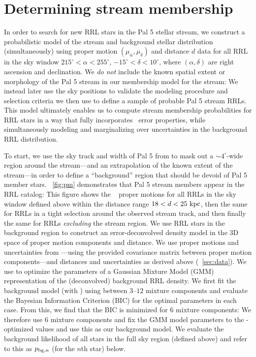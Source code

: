\documentclass[twocolumn]{aastex63}
\begin{document}
\section{Determining stream membership} \label{sec:membership}

In order to search for new RRL stars in the Pal 5 stellar stream, we construct a probabilistic model of the stream and background stellar distribution (simultaneously) using proper motion $(\mu_\alpha, \mu_\delta)$ and distance $d$ data for all RRL in the sky window $215^\circ < \alpha < 255^\circ$, $-15^\circ < \delta < 10^\circ$, where $(\alpha, \delta)$ are right ascension and declination.
We \emph{do not} include the known spatial extent or morphology of the Pal 5 stream in our membership model for the stream: We instead later use the sky positions to validate the modeling procedure and selection criteria we then use to define a sample of probable Pal 5 stream RRLs.
This model ultimately enables us to compute stream membership probabilities for RRL stars in a way that fully incorporates \Gaia\ error properties, while simultaneously modeling and marginalizing over uncertainties in the background RRL distribution.

To start, we use the sky track and width of Pal 5 from \citet{Bonaca:2019} to mask out a $\sim4^\circ$-wide region around the stream---and an extrapolation of the known extent of the stream---in order to define a ``background'' region that should be devoid of Pal 5 member stars.
\figurename~\ref{fig:pm} demonstrates that Pal 5 stream members appear in the RRL catalog: This figure shows the \Gaia\  proper motions for all RRLs in the sky window defined above within the distance range $18 < d < 25~\mathrm{kpc}$, then the same for RRLs in a tight selection around the observed stream track, and then finally the same for RRLs \emph{excluding} the stream region.
We use RRL stars in the background region to construct an error-deconvolved density model in the 3D space of proper motion components and distance.
We use proper motions and uncertainties from \Gaia---using the provided covariance matrix between proper motion components---and distances and uncertainties as derived above (\sectionname~\ref{sec:data}). 
We use  \citep[;][]{Bovy:XD} to optimize the parameters of a Gaussian Mixture Model (GMM) representation of the (deconvolved) background RRL density.
We first fit the background model (with ) using between $3$--$12$ mixture components and evaluate the Bayesian Information Criterion (BIC) for the optimal parameters in each case.
From this, we find that the BIC is minimized for 6 mixture components: We therefore use 6 mixture components and fix the GMM model parameters to the -optimized values and use this as our background model.
We evaluate the background likelihood of all stars in the full sky region (defined above) and refer to this as $p_{{\rm bg}, n}$ (for the $n$th star) below.
\end{document}
